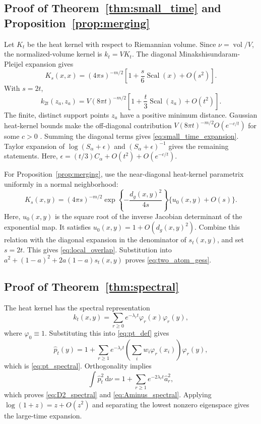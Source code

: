 \documentclass[twoside]{article}
\theoremstyle{definition}
\theoremstyle{remark}
\DeclareMathOperator{\vol}{vol}
\DeclareMathOperator{\Scal}{Scal}
\newcommand{\dd}{\,\mathrm{d}}
\begin{document}
\subsection{Proof of Theorem~\ref{thm:small_time} and Proposition~\ref{prop:merging}}
Let $K_t$ be the heat kernel with respect to Riemannian volume. Since $\nu=\vol/V$, the normalized-volume kernel is $k_t=VK_t$. The diagonal Minakshisundaram-Pleijel expansion gives
\citep{rosenberg_1997_LaplacianRiemannianManifold, grigoryan_2009_HeatKernelAnalysis}
\begin{equation*}
  K_s(x,x)=(4\pi s)^{-m/2}\left[1+\frac{s}{6}\Scal(x)+O(s^2)\right].
\end{equation*}
With $s=2t$,
\begin{equation*}
  k_{2t}(z_a,z_a)=V(8\pi t)^{-m/2}\left[1+\frac{t}{3}\Scal(z_a)+O(t^2)\right].
\end{equation*}
The finite, distinct support points $z_a$ have a positive minimum distance. Gaussian heat-kernel bounds make the off-diagonal contribution $V(8\pi t)^{-m/2}O(e^{-c/t})$ for some $c>0$ \citep{grigoryan_2009_HeatKernelAnalysis}. Summing the diagonal terms gives \eqref{eq:small_time_expansion}. Taylor expansion of $\log(S_\alpha+\epsilon)$ and $(S_\alpha+\epsilon)^{-1}$ gives the remaining statements. Here, $\epsilon=(t/3)C_\alpha+O(t^2)+O(e^{-c/t})$.

For Proposition~\ref{prop:merging}, use the near-diagonal heat-kernel parametrix uniformly in a normal neighborhood:
\begin{equation*}
  K_s(x,y)=(4\pi s)^{-m/2}\exp\left\{-\frac{d_g(x,y)^2}{4s}\right\} \{u_0(x,y)+O(s)\}.
\end{equation*}
Here, $u_0(x,y)$ is the square root of the inverse Jacobian determinant of the exponential map. It satisfies $u_0(x,y)=1+O(d_g(x,y)^2)$. Combine this relation with the diagonal expansion in the denominator of $s_t(x,y)$, and set $s=2t$. This gives \eqref{eq:local_overlap}. Substitution into $a^2+(1-a)^2+2a(1-a)s_t(x,y)$ proves \eqref{eq:two_atom_gess}.

\subsection{Proof of Theorem~\ref{thm:spectral}}
The heat kernel has the spectral representation
\begin{equation*}
  k_t(x,y)=\sum_{r\ge0}e^{-\lambda_rt}\varphi_r(x)\varphi_r(y),
\end{equation*}
where $\varphi_0\equiv1$. Substituting this into \eqref{eq:pt_def} gives
\begin{equation*}
  \widehat p_t(y)=1+\sum_{r\ge1}e^{-\lambda_rt}\left(\sum_iw_i\varphi_r(x_i)\right)\varphi_r(y),
\end{equation*}
which is \eqref{eq:pt_spectral}. Orthogonality implies
\begin{equation*}
  \int\widehat p_t^2\dd\nu=1+\sum_{r\ge1}e^{-2\lambda_rt}\widehat a_r^2,
\end{equation*}
which proves \eqref{eq:D2_spectral} and \eqref{eq:Aminus_spectral}. Applying $\log(1+z)=z+O(z^2)$ and separating the lowest nonzero eigenspace gives the large-time expansion.
\end{document}
